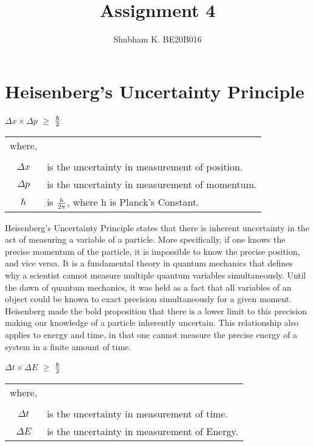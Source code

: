 \documentclass[]{article}
\title{Assignment 4}
\author{Shubham K. BE20B016}
\begin{document}
\maketitle
\section{Heisenberg's Uncertainty Principle}


\begin{center}
 $\Delta x \times \Delta p$ $\ge$ $\hbar \over 2$     
\end{center}


\begin{table}[h]
    \begin{tabular}{c l}
    where, \\
    \\
    $\Delta x$     & is the uncertainty in measurement of position. \\
    $\Delta p$     & is the uncertainty in measurement of momentum. \\
    $\hbar$        & is $h\over 2\pi$, where h is Planck's Constant.
    \end{tabular}
\end{table}

Heisenberg's Uncertainty Principle states that there is inherent uncertainty in the act of measuring a variable of a particle. More specifically, if one knows the precise momentum of the particle, it is impossible to know the precise position, and vice versa. It is a fundamental theory in quantum mechanics that defines why a scientist cannot measure multiple quantum variables simultaneously. Until the dawn of quantum mechanics, it was held as a fact that all variables of an object could be known to exact precision simultaneously for a given moment. Heisenberg made the bold proposition that there is a lower limit to this precision making our knowledge of a particle inherently uncertain. This relationship also applies to energy and time, in that one cannot measure the precise energy of a system in a finite amount of time.


\begin{center}
 $\Delta t \times \Delta E$ $\ge$ $\hbar \over 2$     
\end{center}


\begin{table}[h]
    \begin{tabular}{c l}
    where, \\
    \\
    $\Delta t$     & is the uncertainty in measurement of time. \\
    $\Delta E$     & is the uncertainty in measurement of Energy. 
    \end{tabular}
\end{table}
\end{document}
